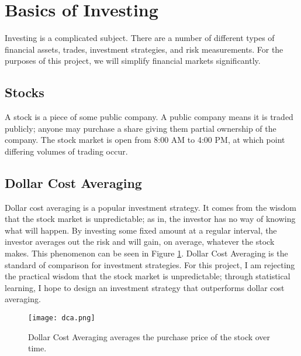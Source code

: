 \documentclass[12pt]{article}
\begin{document}
\section{Basics of Investing}
Investing is a complicated subject. There are a number of different types of financial assets, trades, investment strategies, and risk measurements. For the purposes of this project, we will simplify financial markets significantly. 

\subsection{Stocks}
A stock is a piece of some public company. A public company means it is traded publicly; anyone may purchase a share giving them partial ownership of the company. The stock market is open from 8:00 AM to 4:00 PM, at which point differing volumes of trading occur. 

\subsection{Dollar Cost Averaging}
Dollar cost averaging is a popular investment strategy. It comes from the wisdom that the stock market is unpredictable; as in, the investor has no way of knowing what will happen. By investing some fixed amount at a regular interval, the investor averages out the risk and will gain, on average, whatever the stock makes. This phenomenon can be seen in Figure \ref{dca}. Dollar Cost Averaging is the standard of comparison for investment strategies. For this project, I am rejecting the practical wisdom that the stock market is unpredictable; through statistical learning, I hope to design an investment strategy that outperforms dollar cost averaging.

\begin{figure}[ht]
	\centering
	\texttt{[image: dca.png]}
	\caption{Dollar Cost Averaging averages the purchase price of the stock over time. \cite{dca}}
	\label{dca}
\end{figure}
\end{document}
